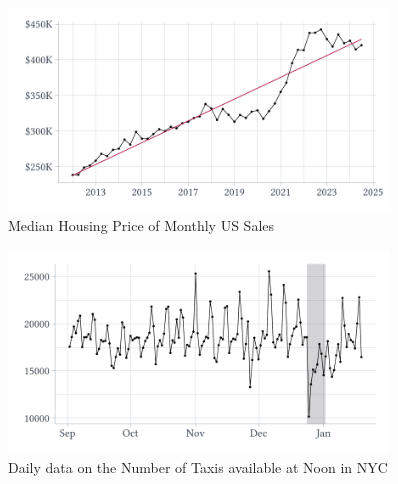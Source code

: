 \documentclass[12pt]{article}
\begin{document}
\begin{figure}[ht!]
  \caption{Median Housing Price of Monthly US Sales}
  \label{fig:housing}
  
  \vspace*{-\bigskipamount}
  \begin{center}
    \includegraphics[width = 0.9\textwidth]{figures/median_us_housing_price_raw.pdf}
  \end{center}
\end{figure}

\begin{figure}[ht!]
  \caption{Daily data on the Number of Taxis available at Noon in NYC}
  \label{fig:taxi}

  \vspace*{-\bigskipamount}
  \begin{center}
    \includegraphics[width = 0.9\textwidth]{figures/nyc_taxis_raw.pdf}
  \end{center}
\end{figure}
\end{document}
